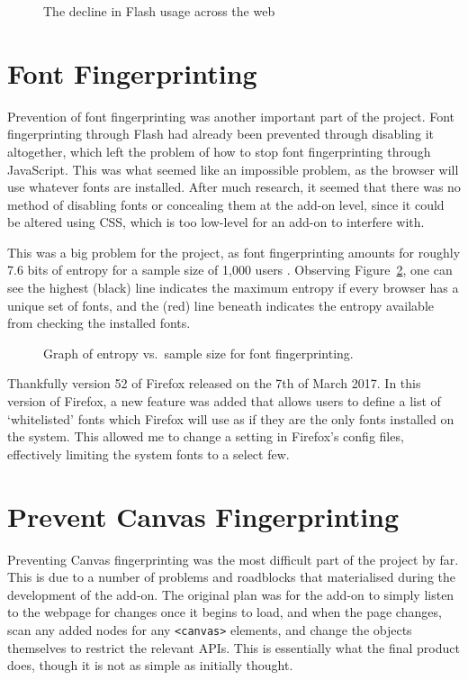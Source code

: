 \begin{figure}[h!]
\centering
\caption{The decline in Flash usage across the web}
\label{fig:flash-usage}
\end{figure}

\section{Font Fingerprinting}

Prevention of font fingerprinting was another important part of the project.
Font fingerprinting through Flash had already been prevented through disabling it altogether, which left the problem of how to stop font fingerprinting through JavaScript.
This was what seemed like an impossible problem, as the browser will use whatever fonts are installed.
After much research, it seemed that there was no method of disabling fonts or concealing them at the add-on level, since it could be altered using CSS, which is too low-level for an add-on to interfere with.

This was a big problem for the project, as font fingerprinting amounts for roughly 7.6 bits of entropy for a sample size of 1,000 users \citep{font-metrics}.
Observing Figure~\ref{fig:font-metrics}, one can see the highest (black) line indicates the maximum entropy if every browser has a unique set of fonts, and the (red) line beneath indicates the entropy available from checking the installed fonts.

\begin{figure}[h!]
\centering
\caption{Graph of entropy vs.\ sample size for font fingerprinting.}
\label{fig:font-metrics}
\end{figure}

Thankfully version 52 of Firefox released on the 7th of March 2017.
In this version of Firefox, a new feature was added that allows users to define a list of `whitelisted' fonts which Firefox will use as if they are the only fonts installed on the system.
This allowed me to change a setting in Firefox's config files, effectively limiting the system fonts to a select few.

\section{Prevent Canvas Fingerprinting}

Preventing Canvas fingerprinting was the most difficult part of the project by far.
This is due to a number of problems and roadblocks that materialised during the development of the add-on.
The original plan was for the add-on to simply listen to the webpage for changes once it begins to load, and when the page changes, scan any added nodes for any \texttt{<canvas>} elements, and change the objects themselves to restrict the relevant APIs.
This is essentially what the final product does, though it is not as simple as initially thought.

